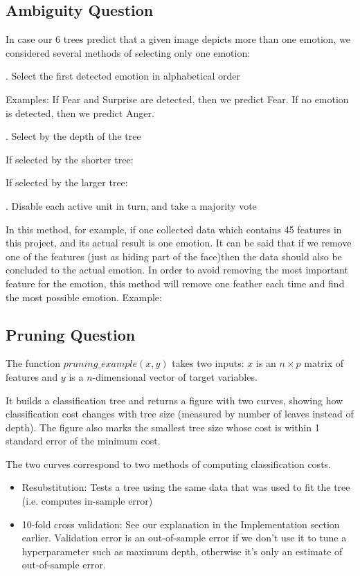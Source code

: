 \documentclass[12pt, a4paper]{article}
\begin{document}
\subsection*{Ambiguity Question}
In case our 6 trees predict that a given image depicts more than one emotion, we considered several methods of selecting only one emotion:\par
{}. Select the first detected emotion in alphabetical order\par
Examples: If Fear and Surprise are detected, then we predict Fear. If no emotion is detected, then we predict Anger.\par
{}. Select by the depth of the tree\par
If selected by the shorter tree:\par
If selected by the larger tree:\par
{}. Disable each active unit in turn, and take a majority vote\par
In this method, for example, if one collected data which contains 45 features in this project, and its actual result is one emotion. It can be said that if we remove one of the features (just as hiding part of the face)then the data should also be concluded to the actual emotion. In order to avoid removing the most important feature for the emotion, this method will remove one feather each time and find the most possible emotion.
Example:\par
\bigskip

\subsection*{Pruning Question}
The function $pruning\_example(x, y)$ takes two inputs: $x$ is an $n \times p$ matrix of features and $y$ is a $n$-dimensional vector of target variables.\par
\bigskip
It builds a classification tree and returns a figure with two curves, showing how classification cost changes with tree size (measured by number of leaves instead of depth). The figure also marks the smallest tree size whose cost is within 1 standard error of the minimum cost.\par
\bigskip
The two curves correspond to two methods of computing classification costs.
\begin{itemize}
    \item Resubstitution: Tests a tree using the same data that was used to fit the tree (i.e. computes in-sample error)
    \item 10-fold cross validation: See our explanation in the Implementation section earlier. Validation error is an out-of-sample error if we don't use it to tune a hyperparameter such as maximum depth, otherwise it's only an estimate of out-of-sample error.
\end{itemize}
\end{document}
